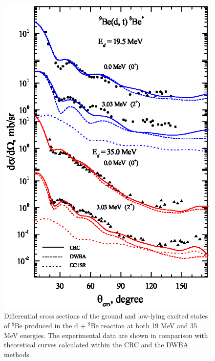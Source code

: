 \documentclass[10pt]{iopart}
\begin{document}
\begin{figure}[tp]
\includegraphics[scale=0.8]{3H8BE.eps}
\caption{
\label{3H8BE} 
Differential cross sections of the ground and low-lying excited states of $^{8}$Be produced in the d + $^9$Be reaction at both 19 MeV and 35 MeV energies. The experimental data are shown in comparison with  theoretical curves calculated within the CRC and the DWBA methods.}
\end{figure}
\end{document}
